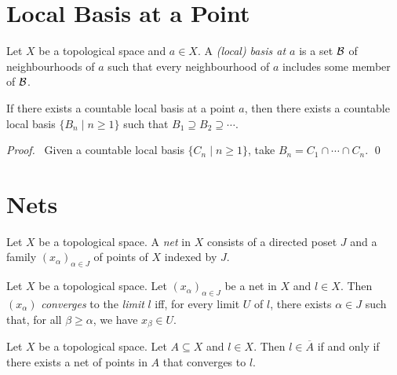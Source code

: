 \section{Local Basis at a Point}

\begin{definition}
    Let $X$ be a topological space and $a \in X$. A \emph{(local) basis at $a$} is a set $\mathcal{B}$ of neighbourhoods of $a$ such that every neighbourhood of $a$ includes some
    member of $\mathcal{B}$.
\end{definition}

\begin{lemma}
    \label{lemma:countable_local_basis}
    If there exists a countable local basis at a point $a$, then there exists a countable local basis $\{ B_n \mid n \geq 1 \}$ such that $B_1 \supseteq B_2 \supseteq \cdots$. 
\end{lemma}

\begin{proof}
    \pf\ Given a countable local basis $\{ C_n \mid n \geq 1 \}$, take $B_n = C_1 \cap \cdots \cap C_n$. \qed
\end{proof}

\section{Nets}

\begin{definition}[Net]
    Let $X$ be a topological space. A \emph{net} in $X$ consists of a directed poset $J$
    and a family $(x_\alpha)_{\alpha \in J}$ of points of $X$ indexed by $J$.
\end{definition}

\begin{definition}[Convergence]
    Let $X$ be a topological space. Let $(x_\alpha)_{\alpha \in J}$ be a net in $X$
    and $l \in X$. Then $(x_\alpha)$ \emph{converges} to the \emph{limit} $l$
    iff, for every limit $U$ of $l$, there exists $\alpha \in J$ such that,
    for all $\beta \geq \alpha$, we have $x_\beta \in U$.
\end{definition}

\begin{lemma}
    \label{lemma:closure_net}
    Let $X$ be a topological space. Let $A \subseteq X$ and $l \in X$. 
    Then $l \in \overline{A}$ if and only if there exists a net of points in $A$
    that converges to $l$.
\end{lemma}

